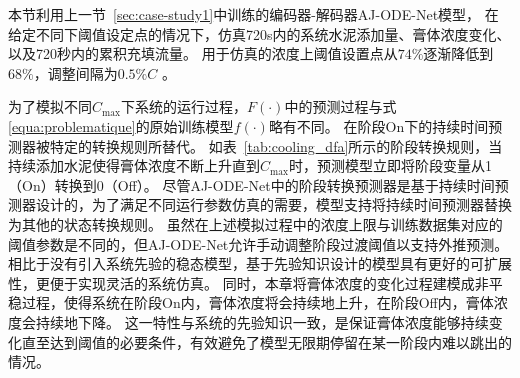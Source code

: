 本节利用上一节~\ref{sec:case-study1}中训练的编码器-解码器AJ-ODE-Net模型，
在给定不同下阈值设定点的情况下，仿真720s内的系统水泥添加量、膏体浓度变化、以及720秒内的累积充填流量。
用于仿真的浓度上阈值设置点从$74\%$逐渐降低到$68\%$，调整间隔为$0.5\%C$ 。

为了模拟不同$C_{\max}$下系统的运行过程，$F(\cdot)$中的预测过程与式\ref{equa:problematique}的原始训练模型$f(\cdot)$略有不同。
在阶段On下的持续时间预测器被特定的转换规则所替代。
如表~\ref{tab:cooling_dfa}所示的阶段转换规则，当持续添加水泥使得膏体浓度不断上升直到$C_{\max}$时，预测模型立即将阶段变量从1（On）转换到0（{Off}）。
尽管AJ-ODE-Net中的阶段转换预测器是基于持续时间预测器设计的，为了满足不同运行参数仿真的需要，模型支持将持续时间预测器替换为其他的状态转换规则。
虽然在上述模拟过程中的浓度上限与训练数据集对应的阈值参数是不同的，但AJ-ODE-Net允许手动调整阶段过渡阈值以支持外推预测。
相比于没有引入系统先验的稳态模型，基于先验知识设计的模型具有更好的可扩展性，更便于实现灵活的系统仿真。
同时，本章将膏体浓度的变化过程建模成非平稳过程，使得系统在阶段On内，膏体浓度将会持续地上升，在阶段Off内，膏体浓度会持续地下降。
这一特性与系统的先验知识一致，是保证膏体浓度能够持续变化直至达到阈值的必要条件，有效避免了模型无限期停留在某一阶段内难以跳出的情况。

